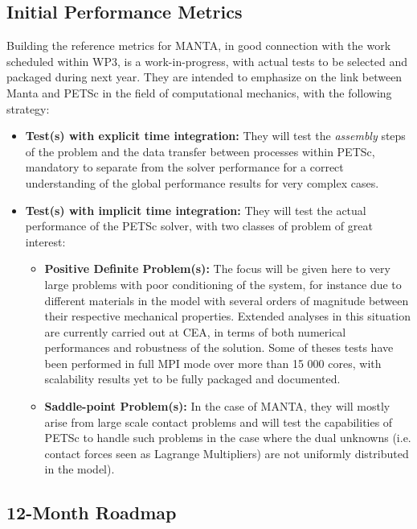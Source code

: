 \subsection{Initial Performance Metrics}
\label{sec:WP3:MANTA:metrics}

Building the reference metrics for MANTA, in good connection with the work scheduled within WP3, is a work-in-progress, with actual tests to be selected and packaged during next year. They are intended to emphasize on the link between Manta and PETSc in the field of computational mechanics, with the following strategy:

\begin{itemize}
    \item \textbf{Test(s) with explicit time integration:} They will test the \textit{assembly} steps of the problem and the data transfer between processes within PETSc, mandatory to separate from the solver performance for a correct understanding of the global performance results for very complex cases.
    \item \textbf{Test(s) with implicit time integration:} They will test the actual  performance of the PETSc solver, with two classes of problem of great interest:
    \begin{itemize}
       \item \textbf{Positive Definite Problem(s):} The focus will be given here to very large problems with poor conditioning of the system, for instance due to different materials in the model with several orders of magnitude between their respective mechanical properties. Extended analyses in this situation are currently carried out at CEA, in terms of both numerical performances and robustness of the solution. Some of theses tests have been performed in full MPI mode over more than 15 000 cores, with scalability results yet to be fully packaged and documented.
       \item \textbf{Saddle-point Problem(s):} In the case of MANTA, they will mostly arise from large scale contact problems and will test the capabilities of PETSc to handle such problems in the case where the dual unknowns (i.e. contact forces seen as Lagrange Multipliers) are not uniformly distributed in the model).
    \end{itemize}
\end{itemize}


\subsection{12-Month Roadmap}
\label{sec:WP3:MANTA:roadmap}

